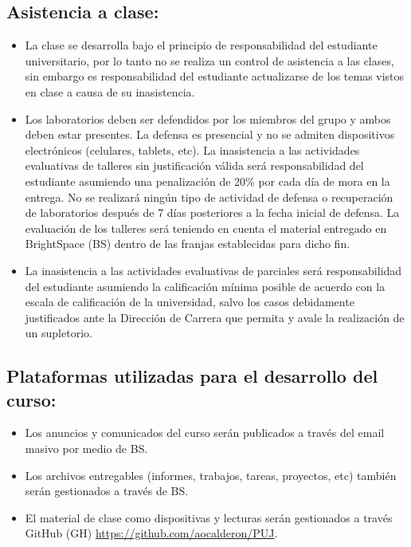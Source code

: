 \documentclass[11pt]{article}
\begin{document}
\subsection{Asistencia a clase:}\label{asistencia-a-clase}
\begin{itemize}
    \item La clase se desarrolla bajo el principio de responsabilidad del estudiante universitario, por lo tanto no se realiza un control de asistencia a las clases, sin embargo es responsabilidad del estudiante actualizarse de los temas vistos en clase a causa de su inasistencia.
    \item Los laboratorios deben ser defendidos por los miembros del grupo y ambos deben estar presentes.  La defensa es presencial y no se admiten dispositivos electrónicos (celulares, tablets, etc).  La inasistencia a las actividades evaluativas de talleres sin justificación válida será responsabilidad del estudiante asumiendo una penalización de 20\% por cada día de mora en la entrega. No se realizará ningún tipo de actividad de defensa o recuperación de laboratorios después de 7 días posteriores a la fecha inicial de defensa. La evaluación de los talleres será teniendo en cuenta el material entregado en BrightSpace (BS) dentro de las franjas establecidas para dicho fin.
    \item La inasistencia a las actividades evaluativas de parciales será responsabilidad del estudiante asumiendo la calificación mínima posible de acuerdo con la escala de calificación de la universidad, salvo los casos debidamente justificados ante la Dirección de Carrera que permita y avale la realización de un supletorio.
\end{itemize}

\subsection{Plataformas utilizadas para el desarrollo del curso:}\label{plataformas-utilizadas-para-el-desarrollo-del-curso}
\begin{itemize}
    \item Los anuncios y comunicados del curso serán publicados a través del email masivo por medio de BS.
    \item Los archivos entregables (informes, trabajos, tareas, proyectos, etc) también serán gestionados a través de BS.
    \item El material de clase como dispositivas y lecturas serán gestionados a través GitHub (GH) \href{https://github.com/aocalderon/PUJ}{https://github.com/aocalderon/PUJ}.
\end{itemize}
\end{document}
